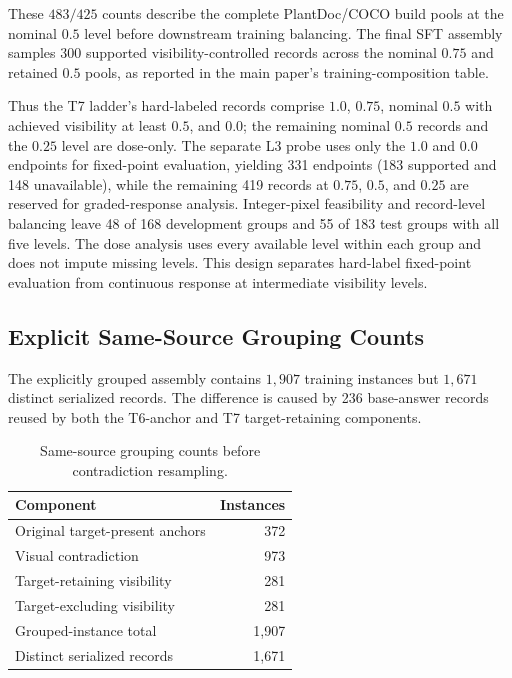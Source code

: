 \documentclass[letterpaper]{article}
\begin{document}
These $483/425$ counts describe the complete PlantDoc/COCO build pools at the
nominal $0.5$ level before downstream training balancing. The final SFT assembly
samples 300 supported visibility-controlled records across the nominal $0.75$
and retained $0.5$ pools, as reported in the main paper's training-composition table.

Thus the T7 ladder's hard-labeled records comprise $1.0$, $0.75$, nominal $0.5$
with achieved visibility at least $0.5$, and $0.0$; the remaining nominal $0.5$
records and the $0.25$ level are dose-only. The separate L3 probe uses only the
$1.0$ and $0.0$ endpoints for fixed-point evaluation, yielding 331
endpoints (183 supported and 148 unavailable), while the remaining 419 records
at $0.75$, $0.5$, and $0.25$ are reserved for graded-response analysis. Integer-pixel feasibility
and record-level balancing leave 48 of 168 development groups and 55 of 183
test groups with all five levels. The dose analysis uses every available level
within each group and does not impute missing levels. This design separates
hard-label fixed-point evaluation from continuous response at intermediate
visibility levels.

\subsection{Explicit Same-Source Grouping Counts}
\label{sec:grouping_counts}

The explicitly grouped assembly contains $1{,}907$ training instances but
$1{,}671$ distinct serialized records. The difference is caused by 236
base-answer records reused by both the T6-anchor and T7 target-retaining
components.
\begin{table}[t]
\centering
\small
\begin{tabular}{lr}
\toprule
Component & Instances \\
\midrule
Original target-present anchors & 372 \\
Visual contradiction & 973 \\
Target-retaining visibility & 281 \\
Target-excluding visibility & 281 \\
\midrule
Grouped-instance total & 1,907 \\
Distinct serialized records & 1,671 \\
\bottomrule
\end{tabular}
\caption{Same-source grouping counts before contradiction resampling.}
\label{tab:explicit_grouping_counts}
\end{table}
\end{document}
